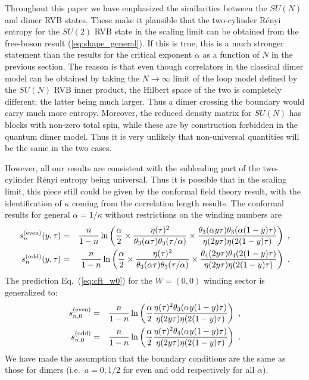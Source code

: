 \documentclass[11pt]{iopart}
\begin{document}
Throughout this paper we have emphasized the similarities between the $SU(N)$ and dimer RVB states. These make it plausible that the two-cylinder R\'enyi entropy for the $SU(2)$ RVB state in the scaling limit can be obtained from the free-boson result (\ref{eq:shape_general}). If this is true, this is a much stronger statement than the results for the critical exponent $\alpha$ as a function of $N$ in the previous section. The reason is that even though correlators in the classical dimer model can be obtained by taking the $N\to\infty$ limit of the loop model defined by the $SU(N)$ RVB inner product, the Hilbert space of the two is completely different; the latter being much larger. Thus a dimer crossing the boundary would carry much more entropy. Moreover, the reduced density matrix for $SU(N)$ has blocks with non-zero total spin, while these are by construction forbidden in the quantum dimer model. Thus it is very unlikely that non-universal quantities will be the same in the two cases. 


However, all our results are consistent with the subleading part of the two-cylinder R\'enyi entropy being universal. Thus it is possible that in the scaling limit, this piece still could be given by the conformal field theory result, with the identification of $\kappa$ coming from the correlation length results.
The conformal results for general $\alpha=1/\kappa$ without restrictions on the winding numbers are
\begin{eqnarray}\label{eq:cft_prediction_gen}
 s_n^{\rm (even)}(y,\tau)&=&\frac{n}{1-n}\ln \left(\frac{\alpha}{2}\times\frac{\eta(\tau)^2}{\theta_3(\alpha\tau)\theta_3(\tau/\alpha)}\times\frac{\theta_3(\alpha y \tau)\theta_3(\alpha(1-y)\tau)}{\eta(2y\tau)\eta(2(1-y)\tau)}\right)\ ,\\ 
 \label{eq:cft_prediction_gen_odd}
 s_n^{\rm (odd)}(y,\tau)&=&\frac{n}{1-n}\ln \left(\frac{\alpha}{2}\times\frac{\eta(\tau)^2}{\theta_3(\alpha\tau)\theta_3(\tau/\alpha)}\times\frac{\theta_4(2y \tau)\theta_4(2(1-y)\tau)}{\eta(2y\tau)\eta(2(1-y)\tau)}\right)\ .
\end{eqnarray}
The prediction Eq.~(\ref{eq:cft_w0}) for the $W=(0,0)$ winding sector is generalized to:
\begin{eqnarray}\label{eq:cft_w0_gen}
 s_{n,0}^{\rm (even)}&=&\frac{n}{1-n}\ln \left(\frac{\alpha}{2}\frac{\eta(\tau)^2\theta_3(\alpha y(1-y)\tau)}{\eta(2y\tau)\eta(2(1-y)\tau)}\right)\ , \\
 \label{eq:cft_w0_gen2}
 s_{n,0}^{\rm (odd )}&=&\frac{n}{1-n}\ln \left(\frac{\alpha}{2}\frac{\eta(\tau)^2\theta_4(\alpha y(1-y)\tau)}{\eta(2y\tau)\eta(2(1-y)\tau)}\right)\ .
\end{eqnarray}
We have made the assumption that the boundary conditions are the same as those for dimers (i.e.\ $a=0,1/2$ for even and odd respectively for all $\alpha$).
\end{document}
